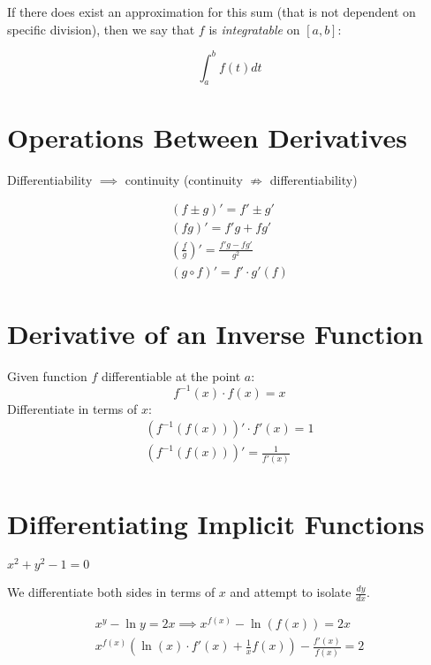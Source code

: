 \documentclass[00_complete]{subfiles}
\begin{document}
If there does exist an approximation for this sum (that is not dependent on
specific division), then we say that $f$ is \emph{integratable} on $[a,b]$:

$$\int_{a}^{b}f(t)dt$$


\section{Operations Between Derivatives}

\begin{note}
        Differentiability $\implies$ continuity
        (continuity $\nRightarrow$ differentiability)
\end{note}

\begin{gather}
    (f \pm g)' = f' \pm g' \\
    (fg)' = f'g+fg' \\
    \left(\frac{f}{g}\right)' = \frac{f'g-fg'}{g^2} \\
    (g \circ f)' = f' \cdot g'(f)
\end{gather}

\section{Derivative of an Inverse Function}

Given function $f$ differentiable at the point $a$:
\[
    f^{-1}(x) \cdot f(x) = x
\]
Differentiate in terms of $x$:
\[
\begin{gathered}
    (f^{-1}(f(x)))'\cdot f'(x) = 1 \\
    (f^{-1}(f(x)))' = \frac{1}{f'(x)} \\
\end{gathered}
\]

\section{Differentiating Implicit Functions}

\begin{example}
    $x^2+y^2-1=0$
\end{example}

We differentiate both sides in terms of $x$ and attempt to isolate $\frac{dy}{dx}$.

\[
    \begin{gathered}
        x^y-\ln y = 2x \implies x^{f(x)} - \ln(f(x))=2x \\
        x^{f(x)}\left(\ln(x)\cdot f'(x)+\frac{1}{x}f(x)\right) - \frac{f'(x)}{f(x)}=2
    \end{gathered}
\]
\end{document}
